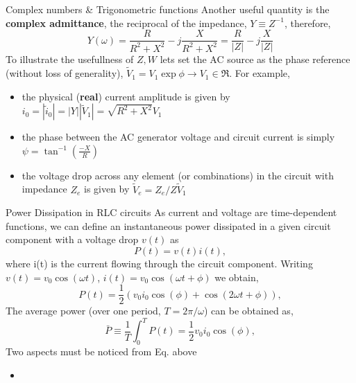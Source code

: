 \begin{frame}[allowframebreaks]{Complex numbers \& Trigonometric functions}
Another useful quantity is the \textbf{complex admittance}, the reciprocal of the impedance, $Y\equiv Z^{-1}$, therefore,
\begin{equation}
  Y(\omega) = \frac{R}{R^2+X^2}-j\frac{X}{R^2+X^2} = \frac{R}{|Z|}-j\frac{X}{|Z|}
\end{equation}
To illustrate the usefullness of $Z,W$ lets set the AC source as the phase reference (without loss of generality), $\tilde{V}_1=V_1\exp\phi\rightarrow V_1\in\Re$. For example,
\begin{itemize}
\item the physical (\textbf{real}) current amplitude is given by $i_0=|\tilde{i}_0|=|Y||\tilde{V}_1|=\sqrt{R^2+X^2}V_1$
\pause
\item the phase between the AC generator voltage and circuit current is simply $\psi=\tan^{-1}\left(\frac{-X}{R}\right)$
\pause
\item the voltage drop across any element (or combinations) in the circuit with impedance $Z_e$ is given by $\tilde{V}_e=Z_e/Z\tilde{V}_1$
\end{itemize}
 


\end{frame}

%
%

\begin{frame}{Power Dissipation in RLC circuits}
As current and voltage are time-dependent functions, we can define an instantaneous power dissipated in a given circuit component with a voltage drop $v(t)$ as
\begin{equation}
  P(t)=v(t)i(t),
\end{equation}
\pause
where i(t) is the current flowing through the circuit component. \pause Writing $v(t)=v_0\cos(\omega t)$, $i(t)=v_0\cos(\omega t+\phi)$ we obtain,
\begin{equation}
  P(t)=\frac{1}{2}\left(v_0 i_0\cos(\phi)+\cos(2\omega t+\phi)\right),
\end{equation}
\pause
The average power (over one period, $T=2\pi/\omega$) can be obtained as,
\begin{equation}
  \bar{P}\equiv\frac{1}{T}\int_0^{T}P(t)=\frac{1}{2}v_0 i_0\cos(\phi),
\end{equation}
\pause
Two aspects must be noticed from Eq. above
\begin{itemize}
  \item 
\end{itemize}
\end{frame}

